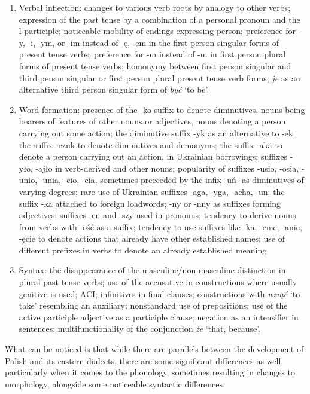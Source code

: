 \begin{enumerate}
    \item Verbal inflection: changes to various verb roots by analogy to other verbs; expression of the past tense by a combination of a personal pronoun and the l-participle; noticeable mobility of endings expressing person; preference for -y, -i, -ym, or -im instead of -ę, -em in the first person singular forms of present tense verbs; preference for -m instead of -m in first person plural forms of present tense verbs; homonymy between first person singular and third person singular or first person plural present tense verb forms; \textit{je} as an alternative third person singular form of \textit{być} `to be'.

    \item Word formation: presence of the -ko suffix to denote diminutives, nouns being bearers of features of other nouns or adjectives, nouns denoting a person carrying out some action; the diminutive suffix -yk as an alternative to -ek; the suffix -czuk to denote diminutives and demonyms; the suffix -aka to denote a person carrying out an action, in Ukrainian borrowings; suffixes -yło, -ajło in verb-derived and other nouns; popularity of suffixes -usio, -osia, -unio, -unia, -cio, -cia, sometimes preceeded by the infix -uń- as diminutives of varying degrees; rare use of Ukrainian suffixes -aga, -yga, -acha, -un; the suffix -ka attached to foreign loadwords; -ny or -nny as suffixes forming adjectives; suffixes -en and -szy used in pronouns; tendency to derive nouns from verbs with -ość as a suffix; tendency to use suffixes like -ka, -enie, -anie, -ęcie to denote actions that already have other established names; use of different prefixes in verbs to denote an already established meaning.

    \item Syntax: the disappearance of the masculine/non-masculine distinction in plural past tense verbs; use of the accusative in constructions where usually genitive is used; ACI; infinitives in final clauses; constructions with \textit{wziąć} `to take' resembling an auxiliary; nonstandard use of prepositions; use of the active participle adjective as a participle clause; negation as an intensifier in sentences; multifunctionality of the conjunction \textit{że} `that, because'.
\end{enumerate}

What can be noticed is that while there are parallels between the development of Polish and its eastern dialects, there are some significant differences as well, particularly when it comes to the phonology, sometimes resulting in changes to morphology, alongside some noticeable syntactic differences. 

